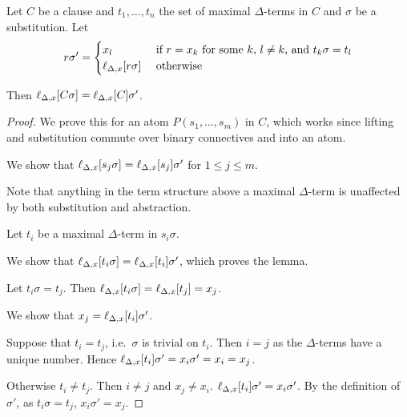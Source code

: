 \documentclass[,%
	paper=a4,%
	DIV14, 
	liststotoc,
	bibtotoc,
	draft=false,%
	numbers=noendperiod
]{scrartcl}
\newcommand{\lif}[1]{\lift{\Delta}{#1}{x}}
\begin{document}
\begin{lemma}
	\label{lemma:lif}

	Let $C$ be a clause and $t_1, \ldots, t_n$ the set of maximal $\Delta$-terms in $C$ and $\sigma$ be a substitution.
	Let $$r \sigma' =
	\begin{cases} 
		x_l & \text{ if } r = x_k \text{ for some $k$, $l\neq k$, and $t_k\sigma = t_l$}  \\ 
		\lif{r\sigma} & \text{ otherwise}
	\end{cases} $$

	Then
	$\lif{C\sigma} =
	\lif{C}\sigma'$.
\end{lemma}
\begin{proof}
	We prove this for an atom $P(s_1, \ldots, s_m)$ in $C$, which works since lifting and substitution commute over binary connectives and into an atom.

	We show that 
	$\lif{s_j \sigma} = \lif{s_j}\sigma'$ for $1 \leq j \leq m$.


	Note that anything in the term structure above a maximal $\Delta$-term is unaffected by both substitution and abstraction.

	Let $t_i$ be a maximal $\Delta$-term in $s_i \sigma$.

	We show that $ \lif{ t_i \sigma } = \lif{ t_i } \sigma'$, which proves the lemma.

	Let $t_i\sigma = t_j$. Then $\lif{ t_i\sigma} = \lif{t_j} = x_j$.

	We show that $x_j = \lif{t_i}\sigma'$.

	Suppose that $t_i = t_j$, i.e.\ $\sigma$ is trivial on $t_i$.
	Then $i=j$ as the $\Delta$-terms have a unique number.
	Hence $\lif{t_i}\sigma' = x_i \sigma' = x_i = x_j$.


	Otherwise $t_i \neq t_j$. Then $i\neq j$ and  $x_j \neq x_i$.\newline
	$\lif{t_i}\sigma' = x_i \sigma'$.
	By the definition of $\sigma'$, as $t_i\sigma = t_j$, $x_i\sigma' = x_j$.
	\begin{comment}
		Suppose no $\Delta$-colored symbol occurs in $s_j$ or $s_j\sigma$. Then $\lif{s_j\sigma} = s_j\sigma $. this equals $  s_j\sigma'$ as there, only the second case applies, where the lifting doesn't affect the term.

		Suppose a maximal $\Delta$-colored term $t_i$ occurs in $s_j\sigma$ but not in $s_j$ and suppose it's the only one in $s_j\sigma$.
		Then $\lif{ s_j\sigma } = \lif{ s_j\sigma^{t_i} }= s_j\sigma^{t_i} \abstraction{t_i/x_i} = \lif{s_j} \sigma^{t_i} \abstraction{t_i/x_i}$
	\end{comment}
\end{proof}
\clearpage
\end{document}
